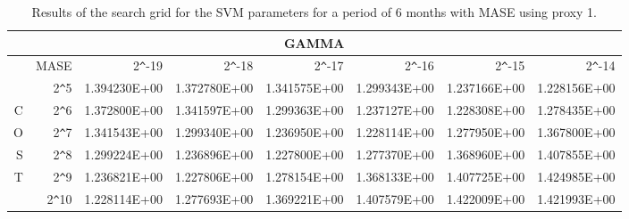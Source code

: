\begin{table}[h!]
\centering
\begin{adjustbox}{width=\textwidth}
\begin{tabular}{|r|r|rrrrrr|}
\hline
\multicolumn{8}{|c|}{GAMMA} \tabularnewline
\hline
 &MASE& 2\verb|^|-19 & 2\verb|^|-18 & 2\verb|^|-17 & 2\verb|^|-16 & 2\verb|^|-15 & 2\verb|^|-14 \\ 
  \hline
  &2\verb|^|5 & 1.394230E+00 & 1.372780E+00 & 1.341575E+00 & 1.299343E+00 & 1.237166E+00 & 1.228156E+00 \\ 
  C&2\verb|^|6 & 1.372800E+00 & 1.341597E+00 & 1.299363E+00 & 1.237127E+00 & 1.228308E+00 & 1.278435E+00 \\ 
  O&2\verb|^|7 & 1.341543E+00 & 1.299340E+00 & 1.236950E+00 & 1.228114E+00 & 1.277950E+00 & 1.367800E+00 \\ 
  S&2\verb|^|8 & 1.299224E+00 & 1.236896E+00 & 1.227800E+00 & 1.277370E+00 & 1.368960E+00 & 1.407855E+00 \\ 
  T&2\verb|^|9 & 1.236821E+00 & 1.227806E+00 & 1.278154E+00 & 1.368133E+00 & 1.407725E+00 & 1.424985E+00 \\ 
  &2\verb|^|10 & 1.228114E+00 & 1.277693E+00 & 1.369221E+00 & 1.407579E+00 & 1.422009E+00 & 1.421993E+00 \\ 
   \hline
\end{tabular}
\end{adjustbox}
\caption{Results of the search grid for the SVM parameters for a period of 6 months with MASE using proxy 1.}
\end{table}